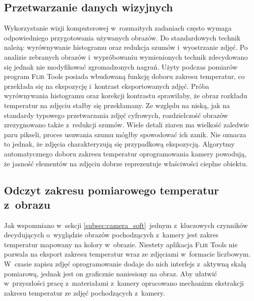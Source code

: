 \subsection{Przetwarzanie danych wizyjnych}
Wykorzystanie wizji komputerowej w~rozmaitych zadaniach często wymaga
odpowiedniego przygotowania używanych obrazów.
Do standardowych technik należą: wyrównywanie histogramu oraz redukcja szumów
i~wyostrzanie zdjęć.
Po analizie zebranych obrazów i~wypróbowaniu wymienionych technik zdecydowano
się jednak nie modyfikować zgromadzonych nagrań.
Użyty podczas pomiarów program \textsc{Flir} Tools posiada wbudowaną funkcję
doboru zakresu temperatur, co przekłada się na ekspozycję i~kontrast
eksportowanych zdjęć.
Próba wyrównywania histogramu oraz korekcji kontrastu sprawiłaby, że obraz
rozkładu temperatur na zdjęciu stałby się przekłamany.
Ze względu na niską, jak na standardy typowego przetwarzania zdjęć cyfrowych,
rozdzielczość obrazów zrezygnowano także z~redukcji szumów.
Wiele detali ziaren ma wielkość zaledwie paru pikseli, proces usuwania szumu
mógłby spowodować ich zanik.
Nie oznacza to jednak, że zdjęcia charakteryzują się przypadkową ekspozycją.
Algorytmy automatycznego doboru zakresu temperatur oprogramowania kamery
powodują, że jasność elementów na zdjęciu dobrze reprezentuje właściwości
cieplne obiektu.

\subsection{Odczyt zakresu pomiarowego temperatur z~obrazu}
Jak wspomniano w~sekcji \ref{subsec:camera_soft}~jednym z~kluczowych czynników
decydujących o~wyglądzie obrazów pochodzących z~kamery jest zakres temperatur
mapowany na kolory w~obrazie.
Niestety aplikacja \textsc{Flir} Tools nie pozwala na eksport zakresu temperatur
wraz ze zdjęciami w~formacie liczbowym.
W~czasie zapisu zdjęć oprogramowanie dodaje do nich interfejs z~aktywną skalą
pomiarową, jednak jest on graficznie naniesiony na obraz.
Aby ułatwić w~przyszłości pracę z~materiałami z~kamery opracowano mechanizm
ekstrakcji zakresu temperatur ze zdjęć pochodzących z~kamery.

